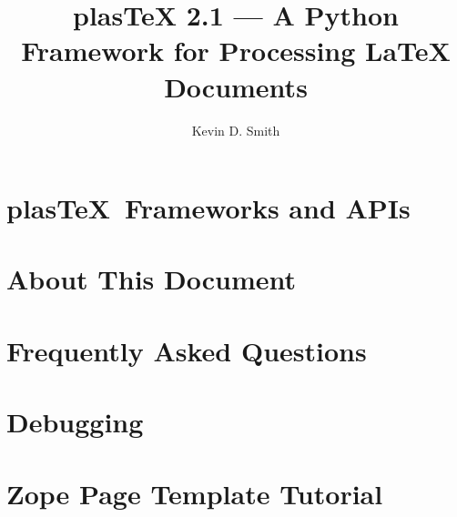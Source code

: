 \documentclass{manual}
\title{plasTeX 2.1 --- A Python Framework for Processing LaTeX Documents}
\author{Kevin D. Smith}
\newcommand{\plasTeX}{plas\TeX}
\begin{document}
\maketitle
\cleardoublepage
\tableofcontents












\chapter{\plasTeX\ Frameworks and APIs}










\appendix

\chapter{About This Document}



\chapter{Frequently Asked Questions}



\chapter{Debugging}



\chapter{Zope Page Template Tutorial\label{sec:zpttutorial}}



\printindex
\end{document}
